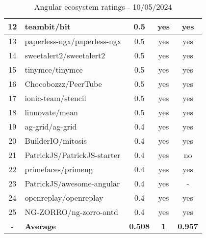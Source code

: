 \begin{table}[H]
{\begin{tabular}{|c|l|c|c|c|}
            12 & teambit/bit                 & 0.5                & yes                        & yes                \\ \hline
            13 & paperless-ngx/paperless-ngx & 0.5                & yes                        & yes                \\ \hline
            14 & sweetalert2/sweetalert2     & 0.5                & yes                        & yes                \\ \hline
            15 & tinymce/tinymce             & 0.5                & yes                        & yes                \\ \hline
            16 & Chocobozzz/PeerTube         & 0.5                & yes                        & yes                \\ \hline
            17 & ionic-team/stencil          & 0.5                & yes                        & yes                \\ \hline
            18 & linnovate/mean              & 0.5                & yes                        & yes                \\ \hline
            19 & ag-grid/ag-grid             & 0.4                & yes                        & yes                \\ \hline
            20 & BuilderIO/mitosis           & 0.4                & yes                        & yes                \\ \hline
            21 & PatrickJS/PatrickJS-starter & 0.4                & yes                        & no                 \\ \hline
            22 & primefaces/primeng          & 0.4                & yes                        & yes                \\ \hline
            23 & PatrickJS/awesome-angular   & 0.4                & yes                        & -                  \\ \hline
            24 & openreplay/openreplay       & 0.4                & yes                        & yes                \\ \hline
            25 & NG-ZORRO/ng-zorro-antd      & 0.4                & yes                        & yes                \\ \hline
            -  & \textbf{Average}            & \textbf{0.508}     & \textbf{1}                 & \textbf{0.957}     \\ \hline
        \end{tabular}
    }
    \caption{Angular ecosystem ratings - 10/05/2024}
    \label{tab:metrics:angular:ratings}
\end{table}

